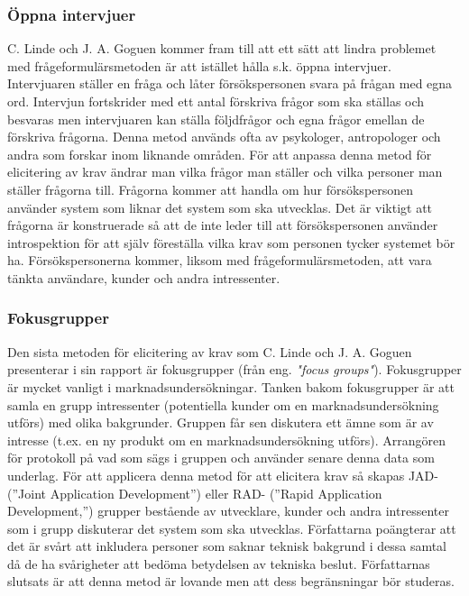 \subsubsection{Öppna intervjuer} 
 C. Linde och J. A. Goguen kommer fram till att ett sätt att lindra problemet med frågeformulärsmetoden är att istället hålla s.k. öppna intervjuer. Intervjuaren ställer en fråga och låter försökspersonen svara på frågan med egna ord. Intervjun fortskrider med ett antal förskriva frågor som ska ställas och besvaras men intervjuaren kan ställa följdfrågor och egna frågor emellan de förskriva frågorna. Denna metod används ofta av psykologer, antropologer och andra som forskar inom liknande områden. För att anpassa denna metod för elicitering av krav ändrar man vilka frågor man ställer och vilka personer man ställer frågorna till. Frågorna kommer att handla om hur försökspersonen använder system som liknar det system som ska utvecklas. Det är viktigt att frågorna är konstruerade så att de inte leder till att försökspersonen använder introspektion för att själv föreställa vilka krav som personen tycker systemet bör ha. Försökspersonerna kommer, liksom med frågeformulärsmetoden, att vara tänkta användare, kunder och andra intressenter. 

\subsubsection{Fokusgrupper}
Den sista metoden för elicitering av krav som C. Linde och J. A. Goguen presenterar i sin rapport är fokusgrupper (från eng. \textit{"focus groups"}). Fokusgrupper är mycket vanligt i marknadsundersökningar. Tanken bakom fokusgrupper är att samla en grupp intressenter (potentiella kunder om en marknadsundersökning utförs) med olika bakgrunder. Gruppen får sen diskutera ett ämne som är av intresse (t.ex. en ny produkt om en marknadsundersökning utförs). Arrangören för protokoll på vad som sägs i gruppen och använder senare denna data som underlag.  För att applicera denna metod för att elicitera krav så skapas JAD- (”Joint Application Development”) eller RAD- (”Rapid Application Development,”) grupper bestående av utvecklare, kunder och andra intressenter som i grupp diskuterar det system som ska utvecklas. Författarna poängterar att det är svårt att inkludera personer som saknar teknisk bakgrund i dessa samtal då de ha svårigheter att bedöma betydelsen av tekniska beslut. Författarnas slutsats är att denna metod är lovande men att dess begränsningar bör studeras. 

